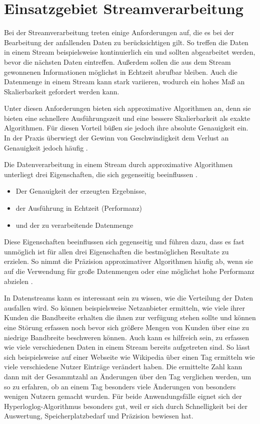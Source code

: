 \section{Einsatzgebiet Streamverarbeitung}
Bei der Streamverarbeitung treten einige Anforderungen auf, 
die es bei der Bearbeitung der anfallenden Daten zu berücksichtigen gilt. 
So treffen die Daten in einem Stream beispielsweise kontinuierlich ein 
und sollten abgearbeitet werden, bevor die nächsten Daten eintreffen. 
Außerdem sollen die aus dem Stream gewonnenen Informationen möglichst in Echtzeit abrufbar bleiben.
Auch die Datenmenge in einem Stream kann stark variieren, wodurch ein hohes Maß an Skalierbarkeit gefordert werden kann.

Unter diesen Anforderungen bieten sich approximative Algorithmen an, denn sie bieten eine schnellere Ausführungszeit und eine bessere Skalierbarkeit als exakte Algorithmen. 
Für diesen Vorteil büßen sie jedoch ihre absolute Genauigkeit ein. 
In der Praxis überwiegt der Gewinn von Geschwindigkeit dem Verlust an Genauigkeit jedoch häufig \cite{maas2019}. 

Die Datenverarbeitung in einem Stream durch approximative Algorithmen unterliegt drei Eigenschaften, 
die sich gegenseitig beeinflussen \cite{maas2019}. 

\begin{itemize}
\item
Der Genauigkeit der erzeugten Ergebnisse,
\item
der Ausführung in Echtzeit (Performanz)
\item
und der zu verarbeitende Datenmenge
\end{itemize}

Diese Eigenschaften beeinflussen sich gegenseitig und führen dazu, 
dass es fast unmöglich ist für allen drei Eigenschaften die bestmöglichen Resultate zu erzielen.
So nimmt die Präzision approximativer Algorithmen häufig ab, 
wenn sie auf die Verwendung für große Datenmengen oder eine möglichst hohe Performanz abzielen \cite{maas2019}.

In Datenstreams kann es interessant sein zu wissen, wie die Verteilung der Daten ausfallen wird. So können beispielsweise Netzanbieter ermitteln, wie viele ihrer Kunden die Bandbreite erhalten die ihnen zur verfügung stehen sollte und können eine Störung erfassen noch bevor sich größere Mengen von Kunden über eine zu niedrige Bandbreite beschweren können.
Auch kann es hilfreich sein, zu erfassen wie viele verschiedenen Daten in einem Stream bereits aufgetreten sind. So lässt sich beispielsweise auf einer Webseite wie Wikipedia über einen Tag ermitteln wie viele verschiedene Nutzer Einträge verändert haben. Die ermittelte Zahl kann dann mit der Gesammtzahl an Änderungen über den Tag verglichen werden, um so zu erfahren, ob an einem Tag besonders viele Änderungen von  besonders wenigen Nutzern gemacht wurden.
Für beide Anwendungsfälle eignet sich der Hyperloglog-Algorithmus besonders gut, weil er sich durch Schnelligkeit bei der Auswertung, Speicherplatzbedarf und Präzision bewiesen hat.

